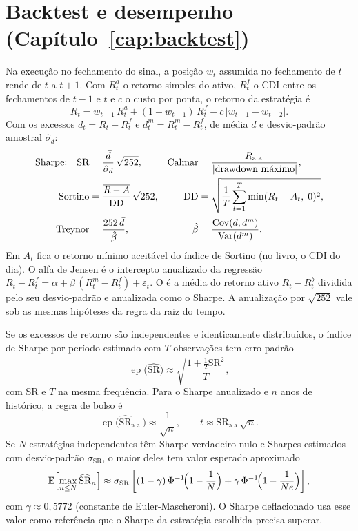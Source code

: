 \section{Backtest e desempenho (Capítulo~\ref{cap:backtest})}

Na execução no fechamento do sinal, a posição $w_t$ assumida no fechamento de $t$ rende de $t$ a $t+1$. Com $R^a_t$ o retorno simples do ativo, $R^f_t$ o CDI entre os fechamentos de $t-1$ e $t$ e $c$ o custo por ponta, o retorno da estratégia é
\begin{equation*}
R_t = w_{t-1}\, R^{a}_t + (1 - w_{t-1})\, R^{f}_t - c\,\lvert w_{t-1} - w_{t-2} \rvert .
\end{equation*}
Com os excessos $d_t = R_t - R^f_t$ e $d^m_t = R^m_t - R^f_t$, de média $\bar d$ e desvio-padrão amostral $\hat\sigma_d$:
\begin{align*}
\text{Sharpe:}\quad \text{SR} &= \frac{\bar d}{\hat\sigma_d}\,\sqrt{252} , &
\text{Calmar} &= \frac{R_{\text{a.a.}}}{\lvert \text{drawdown máximo} \rvert} , \\
\text{Sortino} &= \frac{\overline{R - A}}{\text{DD}}\,\sqrt{252} , &
\text{DD} &= \sqrt{\frac{1}{T}\sum_{t=1}^{T}\min(R_t - A_t,\; 0)^2} , \\
\text{Treynor} &= \frac{252\,\bar d}{\hat\beta} , &
\hat\beta &= \frac{\operatorname{Cov}(d, d^m)}{\operatorname{Var}(d^m)} .
\end{align*}
Em $A_t$ fica o retorno mínimo aceitável do índice de Sortino (no livro, o CDI do dia). O alfa de Jensen é o intercepto anualizado da regressão $R_t - R^f_t = \alpha + \beta\,(R^m_t - R^f_t) + \varepsilon_t$. O  é a média do retorno ativo $R_t - R^b_t$ dividida pelo seu desvio-padrão e anualizada como o Sharpe. A anualização por $\sqrt{252}$ vale sob as mesmas hipóteses da regra da raiz do tempo.

Se os excessos de retorno são independentes e identicamente distribuídos, o índice de Sharpe por período estimado com $T$ observações tem erro-padrão
\begin{equation*}
\operatorname{ep}\bigl(\widehat{\text{SR}}\bigr) \approx \sqrt{\frac{1 + \tfrac{1}{2}\text{SR}^2}{T}} ,
\end{equation*}
com SR e $T$ na mesma frequência. Para o Sharpe anualizado e $n$ anos de histórico, a regra de bolso é
\begin{equation*}
\operatorname{ep}\bigl(\widehat{\text{SR}}_{\text{a.a.}}\bigr) \approx \frac{1}{\sqrt{n}} , \qquad
t \approx \text{SR}_{\text{a.a.}} \sqrt{n} .
\end{equation*}
Se $N$ estratégias independentes têm Sharpe verdadeiro nulo e Sharpes estimados com desvio-padrão $\sigma_{\text{SR}}$, o maior deles tem valor esperado aproximado
\begin{equation*}
\operatorname{\mathbb{E}}\Bigl[\max_{n \le N} \widehat{\text{SR}}_n\Bigr] \approx \sigma_{\text{SR}}
\left[(1-\gamma)\,\Phi^{-1}\!\Bigl(1 - \frac{1}{N}\Bigr) + \gamma\,\Phi^{-1}\!\Bigl(1 - \frac{1}{N e}\Bigr)\right] ,
\end{equation*}
com $\gamma \approx 0,5772$ (constante de Euler-Mascheroni). O Sharpe deflacionado usa esse valor como referência que o Sharpe da estratégia escolhida precisa superar.

